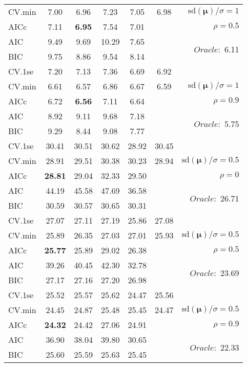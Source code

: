 \begin{table}
\begin{center}
\begin{tabular}{l*{5}{c}|r}
CV.min & 7.00 & 6.96 & 7.23 & 7.05 & 6.98 &  $\mathrm{sd}(\mathbf{\mu})/\sigma=1$ \\
AICc & 7.11 & {\bf 6.95} & 7.54 & 7.01 & & $\rho=0.5$ \\
AIC & 9.49 & 9.69 & 10.29 & 7.65 & &  \multirow{2}{*}{$Oracle: $ 6.11} \\
BIC & 9.75 & 8.86 & 9.54 & 8.14 & &  \\
 \hline 
CV.1se & 7.20 & 7.13 & 7.36 & 6.69 & 6.92 & \\
CV.min & 6.61 & 6.57 & 6.86 & 6.67 & 6.59 &  $\mathrm{sd}(\mathbf{\mu})/\sigma=1$ \\
AICc & 6.72 & {\bf 6.56} & 7.11 & 6.64 & & $\rho=0.9$ \\
AIC & 8.92 & 9.11 & 9.68 & 7.18 & &  \multirow{2}{*}{$Oracle: $ 5.75} \\
BIC & 9.29 & 8.44 & 9.08 & 7.77 & &  \\
 \hline 
CV.1se & 30.41 & 30.51 & 30.62 & 28.92 & 30.45 & \\
CV.min & 28.91 & 29.51 & 30.38 & 30.23 & 28.94 &  $\mathrm{sd}(\mathbf{\mu})/\sigma=0.5$ \\
AICc & {\bf 28.81} & 29.04 & 32.33 & 29.50 & & $\rho=0$ \\
AIC & 44.19 & 45.58 & 47.69 & 36.58 & &  \multirow{2}{*}{$Oracle: $ 26.71} \\
BIC & 30.59 & 30.57 & 30.65 & 30.31 & &  \\
 \hline 
CV.1se & 27.07 & 27.11 & 27.19 & 25.86 & 27.08 & \\
CV.min & 25.89 & 26.35 & 27.03 & 27.01 & 25.93 &  $\mathrm{sd}(\mathbf{\mu})/\sigma=0.5$ \\
AICc & {\bf 25.77} & 25.89 & 29.02 & 26.38 & & $\rho=0.5$ \\
AIC & 39.26 & 40.45 & 42.30 & 32.78 & &  \multirow{2}{*}{$Oracle: $ 23.69} \\
BIC & 27.17 & 27.16 & 27.20 & 26.98 & &  \\
 \hline 
CV.1se & 25.52 & 25.57 & 25.62 & 24.47 & 25.56 & \\
CV.min & 24.45 & 24.87 & 25.48 & 25.45 & 24.47 &  $\mathrm{sd}(\mathbf{\mu})/\sigma=0.5$ \\
AICc & {\bf 24.32} & 24.42 & 27.06 & 24.91 & & $\rho=0.9$ \\
AIC & 36.90 & 38.04 & 39.80 & 30.65 & &  \multirow{2}{*}{$Oracle: $ 22.33} \\
BIC & 25.60 & 25.59 & 25.63 & 25.45 & &  \\
 \hline 
\end{tabular}
\end{center}
\vspace{-1cm}
\end{table}





